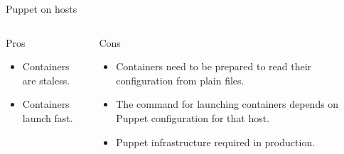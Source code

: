 \documentclass[presentation]{beamer}
\begin{document}
{
\begin{frame}[label=sec-9-4]{Puppet on hosts}

\begin{columns}
\begin{column}{0.5\textwidth}
\begin{block}{Pros}

\begin{itemize}
\item Containers are staless.
\item Containers launch fast.
\end{itemize}
\end{block}
\end{column}

\begin{column}{0.5\textwidth}
\begin{block}{Cons}

\begin{itemize}
\item Containers need to be prepared to read their configuration from plain files.
\item The command for launching containers depends on Puppet configuration for that host.
\item Puppet infrastructure required in production.
\end{itemize}
\end{block}
\end{column}
\end{columns}
\end{frame}
} %
\end{document}
